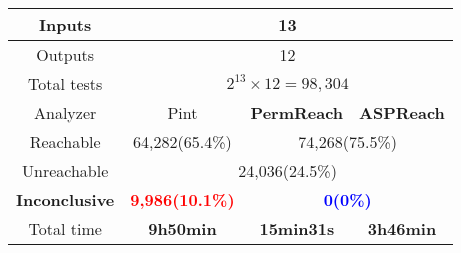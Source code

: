 \begin{table}[ht]
\begin{tabular}{|c|c|c|c|}
     \hline
     Inputs    & \multicolumn{3}{c|}{13}\\
     \hline
     Outputs&\multicolumn{3}{c|}{12}\\
     \hline
     Total tests&\multicolumn{3}{c|}{$2^{13}\times 12=98,304$}\\
     \hline
     Analyzer  &  Pint  &  \textbf{PermReach}   &\textbf{ASPReach}\\
     \hline
     Reachable & 64,282(65.4\%)  & \multicolumn{2}{c|}{74,268(75.5\%)} \\
     \hline
     Unreachable&\multicolumn{3}{c|}{24,036(24.5\%)}\\
     \hline
     \textbf{Inconclusive} &\textcolor{red}{\textbf{9,986(10.1\%)}}&\multicolumn{2}{c|}{\textcolor{blue}{\textbf{0(0\%)}}}   \\
     \hline
     Total time & \textbf{9h50min}      & \textbf{15min31s}         & \textbf{3h46min} \\
     \hline
    \end{tabular}

\end{table}
